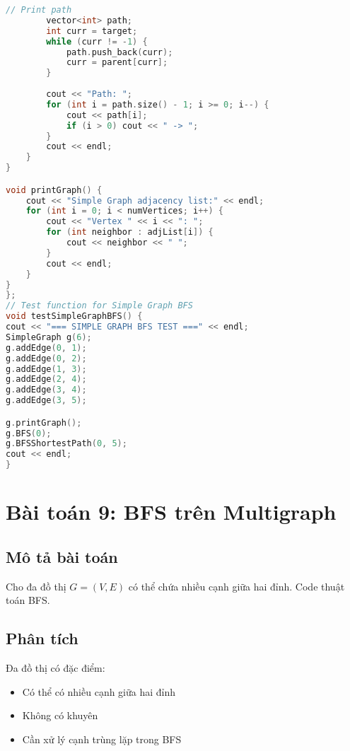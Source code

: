 \documentclass[12pt]{article}
\begin{document}
\begin{lstlisting}[language=C++, caption=BFS cho Simple Graph]
        // Print path
        vector<int> path;
        int curr = target;
        while (curr != -1) {
            path.push_back(curr);
            curr = parent[curr];
        }
        
        cout << "Path: ";
        for (int i = path.size() - 1; i >= 0; i--) {
            cout << path[i];
            if (i > 0) cout << " -> ";
        }
        cout << endl;
    }
}

void printGraph() {
    cout << "Simple Graph adjacency list:" << endl;
    for (int i = 0; i < numVertices; i++) {
        cout << "Vertex " << i << ": ";
        for (int neighbor : adjList[i]) {
            cout << neighbor << " ";
        }
        cout << endl;
    }
}
};
// Test function for Simple Graph BFS
void testSimpleGraphBFS() {
cout << "=== SIMPLE GRAPH BFS TEST ===" << endl;
SimpleGraph g(6);
g.addEdge(0, 1);
g.addEdge(0, 2);
g.addEdge(1, 3);
g.addEdge(2, 4);
g.addEdge(3, 4);
g.addEdge(3, 5);

g.printGraph();
g.BFS(0);
g.BFSShortestPath(0, 5);
cout << endl;
}
\end{lstlisting}
\section{Bài toán 9: BFS trên Multigraph}
\subsection{Mô tả bài toán}
Cho đa đồ thị $G = (V, E)$ có thể chứa nhiều cạnh giữa hai đỉnh. Code thuật toán BFS.
\subsection{Phân tích}
Đa đồ thị có đặc điểm:
\begin{itemize}
\item Có thể có nhiều cạnh giữa hai đỉnh
\item Không có khuyên
\item Cần xử lý cạnh trùng lặp trong BFS
\end{itemize}
\end{document}
